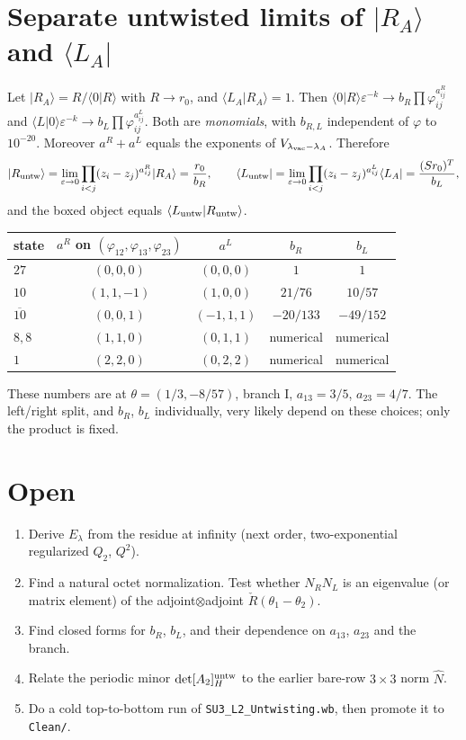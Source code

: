 \documentclass[11pt]{article}
\newcommand{\eps}{\varepsilon}
\newcommand{\vac}{{\rm vac}}
\newcommand{\untw}{{\rm untw}}
\begin{document}
\section{Separate untwisted limits of $|R_A\rangle$ and $\langle L_A|$}

Let $|R_A\rangle=R/\langle0|R\rangle$ with $R\to r_0$, and $\langle L_A|R_A\rangle=1$. Then
$\langle0|R\rangle\eps^{-k}\to b_R\prod\varphi_{ij}^{a^R_{ij}}$ and
$\langle L|0\rangle\eps^{-k}\to b_L\prod\varphi_{ij}^{a^L_{ij}}$. Both are \emph{monomials}, with $b_{R,L}$ independent of $\varphi$ to $10^{-20}$.
Moreover $a^R+a^L$ equals the exponents of $V_{\lambda_\vac-\lambda_A}$. Therefore
\begin{equation}
|R_\untw\rangle=\lim_{\eps\to0}\prod_{i<j}(z_i-z_j)^{a^R_{ij}}|R_A\rangle=\frac{r_0}{b_R},\qquad
\langle L_\untw|=\lim_{\eps\to0}\prod_{i<j}(z_i-z_j)^{a^L_{ij}}\langle L_A|=\frac{(Sr_0)^T}{b_L},
\end{equation}
and the boxed object equals $\langle L_\untw|R_\untw\rangle$.

\begin{center}
\begin{tabular}{lcccc}
\toprule
state & $a^R$ on $(\varphi_{12},\varphi_{13},\varphi_{23})$ & $a^L$ & $b_R$ & $b_L$\\
\midrule
$27$ & $(0,0,0)$ & $(0,0,0)$ & $1$ & $1$\\
$10$ & $(1,1,-1)$ & $(1,0,0)$ & $21/76$ & $10/57$\\
$\overline{10}$ & $(0,0,1)$ & $(-1,1,1)$ & $-20/133$ & $-49/152$\\
$8,8$ & $(1,1,0)$ & $(0,1,1)$ & numerical & numerical\\
$1$ & $(2,2,0)$ & $(0,2,2)$ & numerical & numerical\\
\bottomrule
\end{tabular}
\end{center}
These numbers are at $\theta=(1/3,-8/57)$, branch I, $a_{13}=3/5$, $a_{23}=4/7$. The left/right split, and $b_R$, $b_L$ individually, very likely depend on these choices; only the product is fixed.

\section{Open}
\begin{enumerate}
\item Derive $E_\lambda$ from the residue at infinity (next order, two-exponential regularized $Q_2$, $Q^2$).
\item Find a natural octet normalization. Test whether $N_RN_L$ is an eigenvalue (or matrix element) of the adjoint$\otimes$adjoint $\check R(\theta_1-\theta_2)$.
\item Find closed forms for $b_R$, $b_L$, and their dependence on $a_{13}$, $a_{23}$ and the branch.
\item Relate the periodic minor $\det[A_2]^\untw_H$ to the earlier bare-row $3\times3$ norm $\hat N$.
\item Do a cold top-to-bottom run of \texttt{SU3\_L2\_Untwisting.wb}, then promote it to \texttt{Clean/}.
\end{enumerate}
\end{document}

